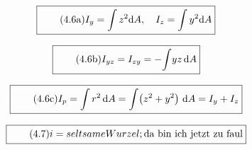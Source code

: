 \documentclass[11pt]{article}
\newcommand{\1}{ {\mathds{1}} }
\begin{document}
		\begin{equation}
			\boxed{
				\tag{4.6a}
				\begin{split}
					I_y
					=
					\int
					z^2\text{d}A, \quad
					I_z
					=
					\int
					y^2\text{d}A
				\end{split}
			}
		\end{equation}
		
		\begin{equation}
			\boxed{
				\tag{4.6b}
				\begin{split}
					I_{yz} = I_{zy} = -\!\int\! y z\, \text{d}A
				\end{split}
			}
		\end{equation}
		
		\begin{equation}
			\boxed{
				\tag{4.6c}
				\begin{split}
					I_p = \int r^2 \,\text{d}A = \int\! \left( z^2 + y^2  \right)\,\text{d}A = I_y + I_z
				\end{split}
			}
		\end{equation}

		\begin{equation}
			\boxed{
				\tag{4.7}
				\begin{split}
					i = seltsame Wurzel; 
					\text{da bin ich jetzt zu faul}
				\end{split}
			}
		\end{equation}
\end{document}
